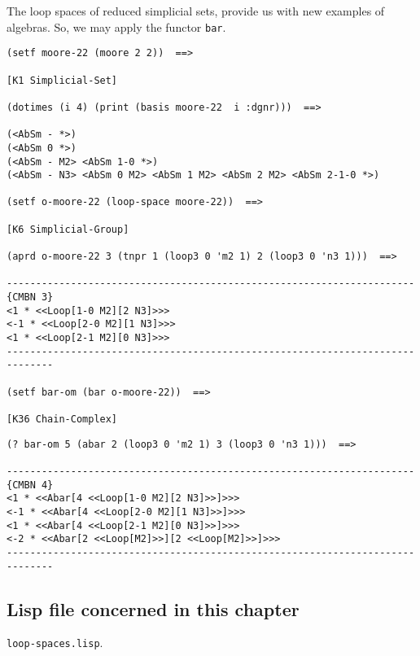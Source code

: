 The loop spaces of reduced simplicial sets, provide us with new examples of algebras. So, we may apply
the functor {\tt bar}.
{\footnotesize\begin{verbatim}
(setf moore-22 (moore 2 2))  ==>

[K1 Simplicial-Set]

(dotimes (i 4) (print (basis moore-22  i :dgnr)))  ==>

(<AbSm - *>)
(<AbSm 0 *>)
(<AbSm - M2> <AbSm 1-0 *>)
(<AbSm - N3> <AbSm 0 M2> <AbSm 1 M2> <AbSm 2 M2> <AbSm 2-1-0 *>)

(setf o-moore-22 (loop-space moore-22))  ==>

[K6 Simplicial-Group]

(aprd o-moore-22 3 (tnpr 1 (loop3 0 'm2 1) 2 (loop3 0 'n3 1)))  ==>

----------------------------------------------------------------------{CMBN 3}
<1 * <<Loop[1-0 M2][2 N3]>>>
<-1 * <<Loop[2-0 M2][1 N3]>>>
<1 * <<Loop[2-1 M2][0 N3]>>>
------------------------------------------------------------------------------

(setf bar-om (bar o-moore-22))  ==>

[K36 Chain-Complex]
\end{verbatim}}
\newpage
{\footnotesize\begin{verbatim}
(? bar-om 5 (abar 2 (loop3 0 'm2 1) 3 (loop3 0 'n3 1)))  ==>

----------------------------------------------------------------------{CMBN 4}
<1 * <<Abar[4 <<Loop[1-0 M2][2 N3]>>]>>>
<-1 * <<Abar[4 <<Loop[2-0 M2][1 N3]>>]>>>
<1 * <<Abar[4 <<Loop[2-1 M2][0 N3]>>]>>>
<-2 * <<Abar[2 <<Loop[M2]>>][2 <<Loop[M2]>>]>>>
------------------------------------------------------------------------------
\end{verbatim}}

\subsection* {Lisp file concerned in this chapter}

{\tt loop-spaces.lisp}.
